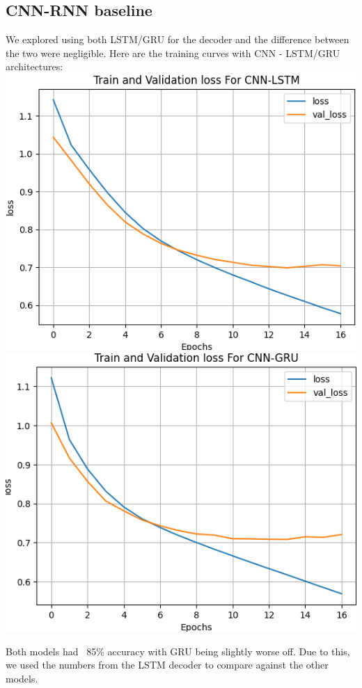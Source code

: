 \documentclass{article}
\begin{document}
\subsection{CNN-RNN baseline}
We explored using both LSTM/GRU for the decoder and the difference between the two were negligible. Here are the training curves with  CNN - LSTM/GRU architectures:
\newline \newline
 \includegraphics[scale=0.45]{lstm_training.png}
 \includegraphics[scale=0.45]{gru_training.png}

Both models had ~85\% accuracy with GRU being slightly worse off. Due to this, we used the numbers from the LSTM decoder to compare against the other models. 
\end{document}
